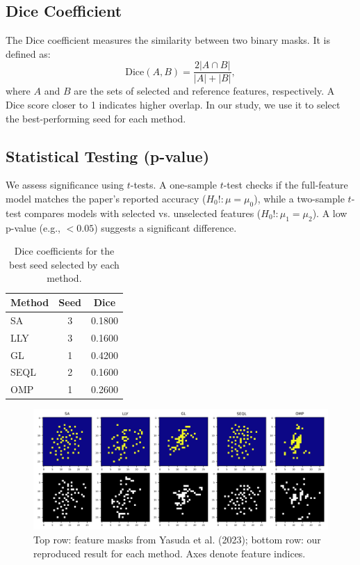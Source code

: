 \documentclass[a4paper,twocolumn]{article} %
\begin{document}
\subsection{Dice Coefficient}
The Dice coefficient measures the similarity between two binary masks. It is defined as:
\begin{equation}
    \mathrm{Dice}(A, B) = \frac{2|A \cap B|}{|A| + |B|},
\end{equation}
where $A$ and $B$ are the sets of selected and reference features, respectively. A Dice score closer to 1 indicates higher overlap. In our study, we use it to select the best-performing seed for each method.
\subsection{Statistical Testing (p-value)}
We assess significance using $t$-tests. A one-sample $t$-test checks if the full-feature model matches the paper's reported accuracy ($H_0!: \mu = \mu_0$), while a two-sample $t$-test compares models with selected vs. unselected features ($H_0!: \mu_1 = \mu_2$). A low p-value (e.g., $< 0.05$) suggests a significant difference.
\begin{table}[ht]
    \centering
    \caption{Dice coefficients for the best seed selected by each method.}
    \begin{tabular}{lcc}
        \hline
        \textbf{Method} & \textbf{Seed} & \textbf{Dice} \\
        \hline
        SA    & 3 & 0.1800 \\
        LLY   & 3 & 0.1600 \\
        GL    & 1 & 0.4200 \\
        SEQL  & 2 & 0.1600 \\
        OMP   & 1 & 0.2600 \\
        \hline
    \end{tabular}
    \label{tab:dice_results}
\end{table}


\begin{figure}[h!]
    \centering
    \includegraphics[width=\textwidth]{figures/all_methods_with_axis.png}
    \caption{Top row: feature masks from Yasuda et al. (2023); bottom row: our reproduced result for each method. Axes denote feature indices.}
    \label{fig:feature_masks}
\end{figure}
\end{document}
